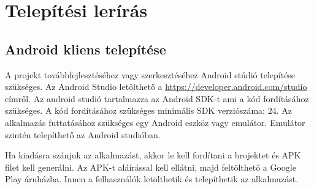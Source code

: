 \section{Telepítési lerírás}
\label{sec:installation}


\subsection{Android kliens telepítése}
A projekt továbbfejlesztéséhez vagy szerkesztéséhez Android stúdió telepítése szükséges. 
Az Android Studio letölthető a \url{https://developer.android.com/studio} címről. 
Az android studió tartalmazza az Android SDK-t ami a kód fordításához szükséges. A kód fordításához szükséges minimális SDK verziószáma: 24.
Az alkalmazás futtatásához szükséges egy Android eszköz vagy emulátor. 
Emulátor szintén telepíthető az Android studióban.

\par
Ha kiadásra szánjuk az alkalmazást, akkor le kell fordítani a brojektet és APK filet kell generálni. 
Az APK-t aláírással kell ellátni, majd feltölthető a Google Play áruházba. 
Innen a felhasználók letölthetik és telepíthetik az alkalmazást.
